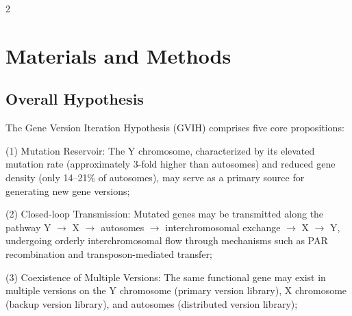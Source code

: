 \documentclass{base}
\begin{document}
\begin{multicols}{2}
\section{Materials and Methods}


\subsection{Overall Hypothesis}
The Gene Version Iteration Hypothesis (GVIH) comprises five core propositions: 

(1) Mutation Reservoir: The Y chromosome, characterized by its elevated mutation rate (approximately 3-fold higher than autosomes) and reduced gene density (only 14--21\% of autosomes), may serve as a primary source for generating new gene versions; 

(2) Closed-loop Transmission: Mutated genes may be transmitted along the pathway Y $\rightarrow$ X $\rightarrow$ autosomes $\rightarrow$ interchromosomal exchange $\rightarrow$ X $\rightarrow$ Y, undergoing orderly interchromosomal flow through mechanisms such as PAR recombination and transposon-mediated transfer; 

(3) Coexistence of Multiple Versions: The same functional gene may exist in multiple versions on the Y chromosome (primary version library), X chromosome (backup version library), and autosomes (distributed version library); 


\end{multicols}
\end{document}
